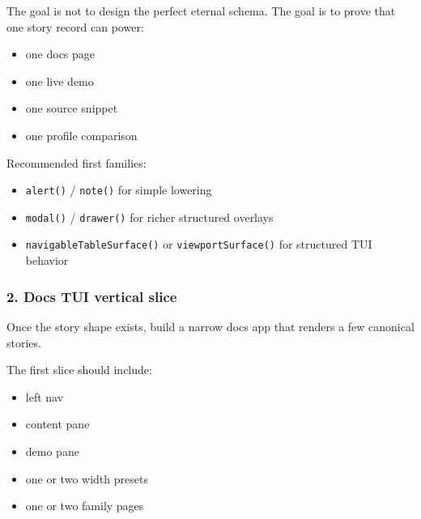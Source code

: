 The goal is not to design the perfect eternal schema. The goal is to prove that one story record can power:

\begin{itemize}
\tightlist
\item
  one docs page
\item
  one live demo
\item
  one source snippet
\item
  one profile comparison
\end{itemize}

Recommended first families:

\begin{itemize}
\tightlist
\item
  \texttt{a\allowbreak{}l\allowbreak{}e\allowbreak{}r\allowbreak{}t\allowbreak{}(\allowbreak{})} / \texttt{n\allowbreak{}o\allowbreak{}t\allowbreak{}e\allowbreak{}(\allowbreak{})} for simple lowering
\item
  \texttt{m\allowbreak{}o\allowbreak{}d\allowbreak{}a\allowbreak{}l\allowbreak{}(\allowbreak{})} / \texttt{d\allowbreak{}r\allowbreak{}a\allowbreak{}w\allowbreak{}e\allowbreak{}r\allowbreak{}(\allowbreak{})} for richer structured overlays
\item
  \texttt{n\allowbreak{}a\allowbreak{}v\allowbreak{}i\allowbreak{}g\allowbreak{}a\allowbreak{}b\allowbreak{}l\allowbreak{}e\allowbreak{}T\allowbreak{}a\allowbreak{}b\allowbreak{}l\allowbreak{}e\allowbreak{}S\allowbreak{}u\allowbreak{}r\allowbreak{}f\allowbreak{}a\allowbreak{}c\allowbreak{}e\allowbreak{}(\allowbreak{})} or \texttt{v\allowbreak{}i\allowbreak{}e\allowbreak{}w\allowbreak{}p\allowbreak{}o\allowbreak{}r\allowbreak{}t\allowbreak{}S\allowbreak{}u\allowbreak{}r\allowbreak{}f\allowbreak{}a\allowbreak{}c\allowbreak{}e\allowbreak{}(\allowbreak{})} for structured TUI behavior
\end{itemize}

\subsubsection{2. Docs TUI vertical slice}\label{record-042-docs-tui-vertical-slice}

Once the story shape exists, build a narrow docs app that renders a few canonical stories.

The first slice should include:

\begin{itemize}
\tightlist
\item
  left nav
\item
  content pane
\item
  demo pane
\item
  one or two width presets
\item
  one or two family pages
\end{itemize}

